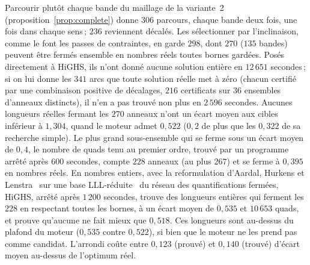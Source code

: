 \documentclass[11pt,a4paper]{article}
\begin{document}
Parcourir plutôt chaque bande du maillage de la variante~2
(proposition~\ref{prop:complete}) donne $306$ parcours, chaque bande deux
fois, une fois dans chaque sens\,; $236$ reviennent décalés. Les
sélectionner par l'inclinaison, comme le font les passes de contraintes, en
garde $298$, dont $270$ ($135$ bandes) peuvent être fermés ensemble en
nombres réels toutes bornes gardées. Posés directement à HiGHS, ils n'ont
donné aucune solution entière en $12\,651$ secondes\,; si on lui donne les
$341$ arcs que toute solution réelle met à zéro (chacun certifié par une
combinaison positive de décalages, $216$ certificats sur $36$ ensembles
d'anneaux distincts), il n'en a pas trouvé non plus en $2\,596$ secondes.
Aucunes longueurs réelles fermant les $270$ anneaux n'ont un écart moyen aux
cibles inférieur à $1,304$, quand le moteur admet $0,522$ ($0,2$ de plus que
les $0,322$ de sa recherche simple). Le plus grand sous-ensemble qui se
ferme sous un écart moyen de $0,4$, le nombre de quads tenu au premier
ordre, trouvé par un programme arrêté après $600$ secondes, compte $228$
anneaux (au plus $267$) et se ferme à $0,395$ en nombres réels. En nombres
entiers, avec la reformulation d'Aardal, Hurkens et
Lenstra~\cite{aardal2000diophantine} sur une base
LLL-réduite~\cite{lenstra1982lll} du réseau des quantifications fermées,
HiGHS, arrêté après $1\,200$ secondes, trouve des longueurs entières qui
ferment les $228$ en respectant toutes les bornes, à un écart moyen de
$0,535$ et $10\,653$ quads, et prouve qu'aucune ne fait mieux que $0,518$.
Ces longueurs sont au-dessus du plafond du moteur ($0,535$ contre $0,522$),
si bien que le moteur ne les prend pas comme candidat. L'arrondi coûte entre
$0,123$ (prouvé) et $0,140$ (trouvé) d'écart moyen au-dessus de l'optimum
réel.
\end{document}
